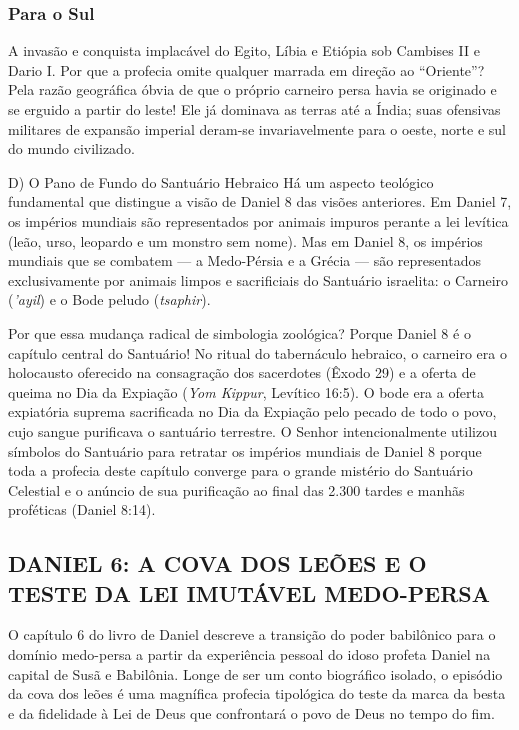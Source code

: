 \subsubsection*{Para o Sul}
A invasão e conquista implacável do Egito, Líbia e Etiópia sob Cambises II e Dario I.
Por que a profecia omite qualquer marrada em direção ao ``Oriente''? Pela razão geográfica óbvia de que o próprio carneiro persa havia se originado e se erguido a partir do leste! Ele já dominava as terras até a Índia; suas ofensivas militares de expansão imperial deram-se invariavelmente para o oeste, norte e sul do mundo civilizado.

D) O Pano de Fundo do Santuário Hebraico
Há um aspecto teológico fundamental que distingue a visão de Daniel 8 das visões anteriores. Em Daniel 7, os impérios mundiais são representados por animais impuros perante a lei levítica (leão, urso, leopardo e um monstro sem nome). Mas em Daniel 8, os impérios mundiais que se combatem — a Medo-Pérsia e a Grécia — são representados exclusivamente por animais limpos e sacrificiais do Santuário israelita: o Carneiro (\textit{'ayil}) e o Bode peludo (\textit{tsaphir}).

Por que essa mudança radical de simbologia zoológica?
Porque Daniel 8 é o capítulo central do Santuário! No ritual do tabernáculo hebraico, o carneiro era o holocausto oferecido na consagração dos sacerdotes (Êxodo 29) e a oferta de queima no Dia da Expiação (\textit{Yom Kippur}, Levítico 16:5). O bode era a oferta expiatória suprema sacrificada no Dia da Expiação pelo pecado de todo o povo, cujo sangue purificava o santuário terrestre. O Senhor intencionalmente utilizou símbolos do Santuário para retratar os impérios mundiais de Daniel 8 porque toda a profecia deste capítulo converge para o grande mistério do Santuário Celestial e o anúncio de sua purificação ao final das 2.300 tardes e manhãs proféticas (Daniel 8:14).



\subsection{DANIEL 6: A COVA DOS LEÕES E O TESTE DA LEI IMUTÁVEL MEDO-PERSA}


O capítulo 6 do livro de Daniel descreve a transição do poder babilônico para o domínio medo-persa a partir da experiência pessoal do idoso profeta Daniel na capital de Susã e Babilônia. Longe de ser um conto biográfico isolado, o episódio da cova dos leões é uma magnífica profecia tipológica do teste da marca da besta e da fidelidade à Lei de Deus que confrontará o povo de Deus no tempo do fim.

